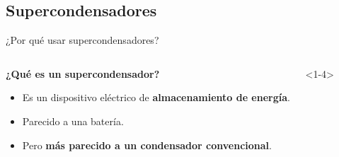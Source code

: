 \documentclass[aspectratio=169]{beamer}
\begin{document}
	\subsection{Supercondensadores}
	\begin{frame}{¿Por qué usar supercondensadores?}
		\begin{columns}
			\begin{column}{0.5\textwidth}
				\only<1->\textbf{¿Qué es un supercondensador?}
				\begin{itemize}[<+(1)->]
					\item Es un dispositivo eléctrico de \textbf{almacenamiento de energía}.
					\item Parecido a una batería.
					\item Pero \textbf{más parecido a un condensador convencional}.
				\end{itemize}
			\end{column}
			\begin{column}{0.5\textwidth}
				\begin{onlyenv}<1-4>
					\begin{figure}[b]
\end{figure}
\end{onlyenv}
\end{column}
\end{columns}
\end{frame}
\end{document}
